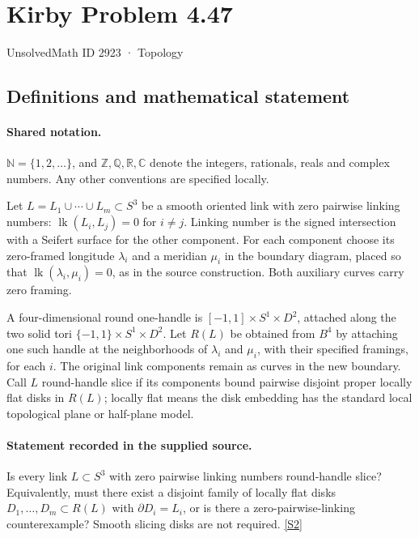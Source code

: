 \documentclass[11pt]{article}
\newcommand{\sref}[2]{\hyperlink{source:#1:#2}{[S#2]}}
\begin{document}
\setcounter{section}{2922}
\section{Kirby Problem 4.47}\label{2923}
{\small\sffamily UnsolvedMath ID 2923 · Topology}
\subsection{Definitions and mathematical statement}

\paragraph{Shared notation.}$\mathbb N=\{1,2,\ldots\}$, and $\mathbb Z,\mathbb Q,\mathbb R,\mathbb C$ denote the integers, rationals, reals and complex numbers. Any other conventions are specified locally.


Let $L=L_1\cup\cdots\cup L_m\subset S^3$ be a smooth oriented link with zero pairwise linking numbers: $\operatorname{lk}(L_i,L_j)=0$ for $i\ne j$. Linking number is the signed intersection with a Seifert surface for the other component. For each component choose its zero-framed longitude $\lambda_i$ and a meridian $\mu_i$ in the boundary diagram, placed so that $\operatorname{lk}(\lambda_i,\mu_i)=0$, as in the source construction. Both auxiliary curves carry zero framing.

A four-dimensional round one-handle is $[-1,1]\times S^1\times D^2$, attached along the two solid tori $\{-1,1\}\times S^1\times D^2$. Let $R(L)$ be obtained from $B^4$ by attaching one such handle at the neighborhoods of $\lambda_i$ and $\mu_i$, with their specified framings, for each $i$. The original link components remain as curves in the new boundary. Call $L$ round-handle slice if its components bound pairwise disjoint proper locally flat disks in $R(L)$; locally flat means the disk embedding has the standard local topological plane or half-plane model.
\paragraph{Statement recorded in the supplied source.}
Is every link $L\subset S^3$ with zero pairwise linking numbers round-handle slice? Equivalently, must there exist a disjoint family of locally flat disks $D_1,\ldots,D_m\subset R(L)$ with $\partial D_i=L_i$, or is there a zero-pairwise-linking counterexample? Smooth slicing disks are not required. \sref{2923}{2}
\end{document}
